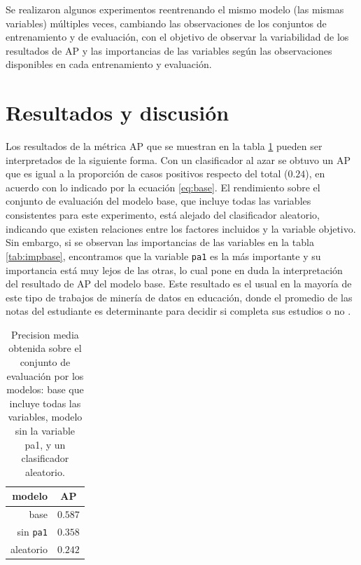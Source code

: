 \documentclass[a4paper,11pt,dvipsnames]{article}
\begin{document}
Se realizaron algunos experimentos reentrenando el mismo modelo (las mismas variables) múltiples veces, cambiando las observaciones de los conjuntos de entrenamiento y de evaluación, con el objetivo de observar la variabilidad de los resultados de AP y las importancias de las variables según las observaciones disponibles en cada entrenamiento y evaluación.

\section{Resultados y discusión}

Los resultados de la métrica AP que se muestran en la tabla \ref{tab:aps} pueden ser interpretados de la siguiente forma. Con un clasificador al azar \cite{ojala2010:permutations} se obtuvo un AP que es igual a la proporción de casos positivos respecto del total ($0.24$), en acuerdo con lo indicado por la ecuación \ref{eq:base}. El rendimiento sobre el conjunto de evaluación del modelo base, que incluye todas las variables consistentes para este experimento, está alejado del clasificador aleatorio, indicando que existen relaciones entre los factores incluidos y la variable objetivo. Sin embargo, si se observan las importancias de las variables en la tabla \ref{tab:impbase}, encontramos que la variable \texttt{pa1} es la más importante y su importancia está muy lejos de las otras, lo cual pone en duda la interpretación del resultado de AP del modelo base. Este resultado es el usual en la mayoría de este tipo de trabajos de minería de datos en educación, donde el promedio de las notas del estudiante es determinante para decidir si completa sus estudios o no \cite{SHAHIRI2015414}.\par\medskip

\begin{table}[!ht]
    \caption{Precision media obtenida sobre el conjunto de evaluación por los modelos: base que incluye todas las variables, modelo sin la variable pa1, y un clasificador aleatorio.}
    \begin{center}
    \begin{tabular}{rc}
    \hline
    \textbf{modelo} & \textbf{AP}\\
    \hline
    base  & $0.587$ \\
    sin \texttt{pa1}  & $0.358$ \\
    aleatorio  & $0.242$ \\
    \hline
    \end{tabular}
    \label{tab:aps}
    \end{center}
\end{table}
\end{document}
